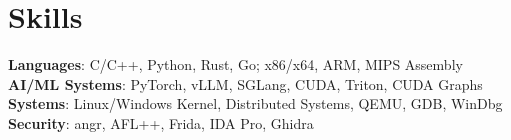 \documentclass[letterpaper,10pt]{article}
\begin{document}
\section{Skills}
\begin{itemize}[leftmargin=0.15in, label={}]
  \small{\item{
    \textbf{Languages}{: C/C++, Python, Rust, Go; x86/x64, ARM, MIPS Assembly} \\
    \textbf{AI/ML Systems}{: PyTorch, vLLM, SGLang, CUDA, Triton, CUDA Graphs} \\
    \textbf{Systems}{: Linux/Windows Kernel, Distributed Systems, QEMU, GDB, WinDbg} \\
    \textbf{Security}{: angr, AFL++, Frida, IDA Pro, Ghidra} \\
  }}
\end{itemize}

\end{document}
